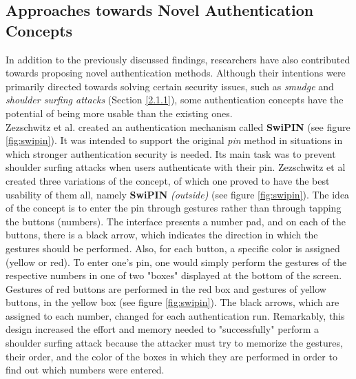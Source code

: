 \subsection{Approaches towards Novel Authentication Concepts} \label{2.2.3}
In addition to the previously discussed findings, researchers have also contributed towards proposing novel authentication methods. Although their intentions were primarily directed towards solving certain security issues, such as \textit{smudge} and \textit{shoulder surfing attacks} (Section \ref{2.1.1}), some authentication concepts have the potential of being more usable than the existing ones.\\

Zezschwitz et al. \cite{Swipin} created an authentication mechanism called \textbf{SwiPIN} (see figure \ref{fig:swipin}). It was intended to support the original \textit{pin} method in situations in which stronger authentication security is needed. Its main task was to prevent shoulder surfing attacks when users authenticate with their pin. Zezschwitz et al \cite{Swipin} created three variations of the concept, of which one proved to have the best usability of them all, namely \textbf{SwiPIN} \textit{(outside)} (see figure \ref{fig:swipin}). The idea of the concept is to enter the pin through gestures rather than through tapping the buttons (numbers). The interface presents a number pad, and on each of the buttons, there is a black arrow, which indicates the direction in which the gestures should be performed. Also, for each button, a specific color is assigned (yellow or red). To enter one's pin, one would simply perform the gestures of the respective numbers in one of two "boxes" displayed at the bottom of the screen. Gestures of red buttons are performed in the red box and gestures of yellow buttons, in the yellow box (see figure \ref{fig:swipin}). The black arrows, which are assigned to each number, changed for each authentication run. Remarkably, this design increased the effort and memory needed to "successfully" perform a shoulder surfing attack because the attacker must try to memorize the gestures, their order, and the color of the boxes in which they are performed in order to find out which numbers were entered. \\

